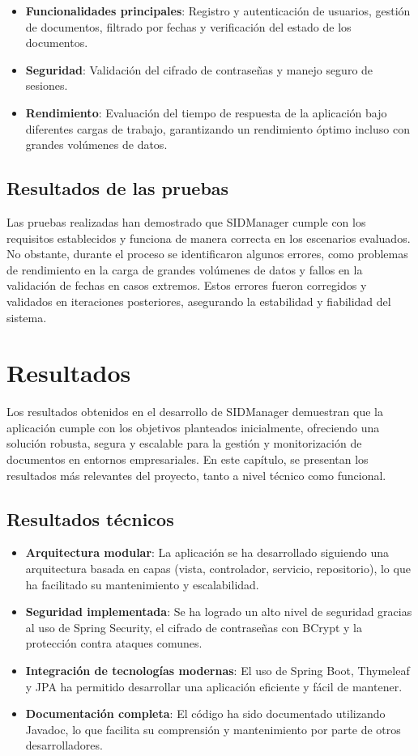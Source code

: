 \documentclass[draft]{scrbook}
\begin{document}
\begin{itemize}
    \item \textbf{Funcionalidades principales}: Registro y autenticación de usuarios, gestión de documentos, filtrado por fechas y verificación del estado de los documentos.
    \item \textbf{Seguridad}: Validación del cifrado de contraseñas y manejo seguro de sesiones.
    \item \textbf{Rendimiento}: Evaluación del tiempo de respuesta de la aplicación bajo diferentes cargas de trabajo, garantizando un rendimiento óptimo incluso con grandes volúmenes de datos.
\end{itemize}

\section{Resultados de las pruebas}
Las pruebas realizadas han demostrado que SIDManager cumple con los requisitos establecidos y funciona de manera correcta en los escenarios evaluados. No obstante, durante el proceso se identificaron algunos errores, como problemas de rendimiento en la carga de grandes volúmenes de datos y fallos en la validación de fechas en casos extremos. Estos errores fueron corregidos y validados en iteraciones posteriores, asegurando la estabilidad y fiabilidad del sistema.

\chapter{Resultados}\label{resultados}
Los resultados obtenidos en el desarrollo de SIDManager demuestran que la aplicación cumple con los objetivos planteados inicialmente, ofreciendo una solución robusta, segura y escalable para la gestión y monitorización de documentos en entornos empresariales. En este capítulo, se presentan los resultados más relevantes del proyecto, tanto a nivel técnico como funcional.

\section{Resultados técnicos}
\begin{itemize}
    \item \textbf{Arquitectura modular}: La aplicación se ha desarrollado siguiendo una arquitectura basada en capas (vista, controlador, servicio, repositorio), lo que ha facilitado su mantenimiento y escalabilidad.
    \item \textbf{Seguridad implementada}: Se ha logrado un alto nivel de seguridad gracias al uso de Spring Security, el cifrado de contraseñas con BCrypt y la protección contra ataques comunes.
    \item \textbf{Integración de tecnologías modernas}: El uso de Spring Boot, Thymeleaf y JPA ha permitido desarrollar una aplicación eficiente y fácil de mantener.
    \item \textbf{Documentación completa}: El código ha sido documentado utilizando Javadoc, lo que facilita su comprensión y mantenimiento por parte de otros desarrolladores.
\end{itemize}
\end{document}
